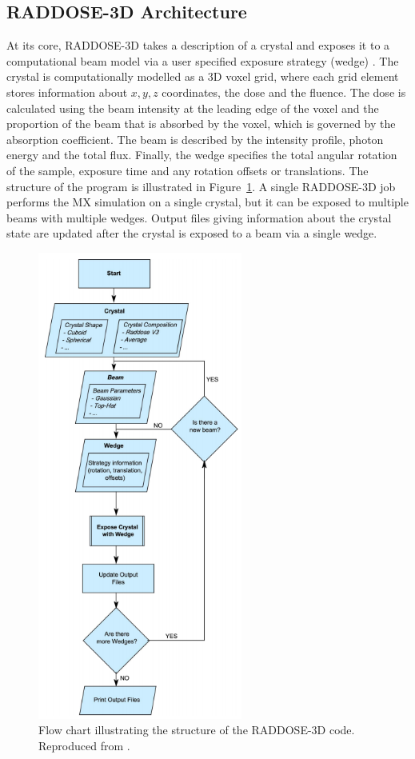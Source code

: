 \subsection{RADDOSE-3D Architecture}
\label{sub:RADDOSE-3D Architecture}
At its core, RADDOSE-3D takes a description of a crystal and exposes it to a computational beam model via a user specified exposure strategy (wedge) \cite{zeldin2013}.
The crystal is computationally modelled as a 3D voxel grid, where each grid element stores information about $x, y, z$ coordinates, the dose and the fluence.
The dose is calculated using the beam intensity at the leading edge of the voxel and the proportion of the beam that is absorbed by the voxel, which is governed by the absorption coefficient.
The beam is described by the intensity profile, photon energy and the total flux.
Finally, the wedge specifies the total angular rotation of the sample, exposure time and any rotation offsets or translations.
The structure of the program is illustrated in Figure~\ref{fig:RADDOSE-3D Flow diagram}.
A single RADDOSE-3D job performs the MX simulation on a single crystal, but it can be exposed to multiple beams with multiple wedges.
Output files giving information about the crystal state are updated after the crystal is exposed to a beam via a single wedge.
\begin{figure}
    \centering
    \includegraphics[width=0.6\textwidth]{figures/saxs/raddose_flow.png}
    \caption{Flow chart illustrating the structure of the RADDOSE-3D code.
    Reproduced from \cite{zeldin2013}.}
    \label{fig:RADDOSE-3D Flow diagram}
\end{figure}

